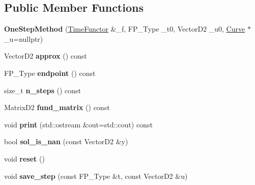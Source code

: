 \subsection*{Public Member Functions}
\begin{DoxyCompactItemize}
\item 
\mbox{\label{classOneStepMethod_af80b8284dc4c01633056d626e96dcce2}} 
{\bfseries One\+Step\+Method} (\hyperlink{classTimeFunctor}{Time\+Functor} \&\+\_\+f, F\+P\+\_\+\+Type \+\_\+t0, Vector\+D2 \+\_\+u0, \hyperlink{classCurve}{Curve} $\ast$\+\_\+u=nullptr)
\item 
\mbox{\label{classOneStepMethod_a5f4529edf5aae96d1dd0061b7a798e4f}} 
Vector\+D2 {\bfseries approx} () const
\item 
\mbox{\label{classOneStepMethod_a5fa1efcb274907b97f31cfbbb0c5dc07}} 
F\+P\+\_\+\+Type {\bfseries endpoint} () const
\item 
\mbox{\label{classOneStepMethod_a7ae5bcaf0c1e48551456a6f0835414d2}} 
size\+\_\+t {\bfseries n\+\_\+steps} () const
\item 
\mbox{\label{classOneStepMethod_ad59a0fce9906ba9159da74aea44b3431}} 
Matrix\+D2 {\bfseries fund\+\_\+matrix} () const
\item 
\mbox{\label{classOneStepMethod_aa3fc1d095086c736ef23c60e56034474}} 
void {\bfseries print} (std\+::ostream \&out=std\+::cout) const
\item 
\mbox{\label{classOneStepMethod_ad5e6154e9cc700056474c1c6128e3e9f}} 
bool {\bfseries sol\+\_\+is\+\_\+nan} (const Vector\+D2 \&y)
\item 
\mbox{\label{classOneStepMethod_a4e6743b0343a6c5bb75e423649915b86}} 
void {\bfseries reset} ()
\item 
\mbox{\label{classOneStepMethod_a511d73f8ac7ba27a4e0289b70be7ffad}} 
void {\bfseries save\+\_\+step} (const F\+P\+\_\+\+Type \&t, const Vector\+D2 \&u)
\item 
\mbox{\label{classOneStepMethod_aee957997a620c414ebb999df49debf5b}} 

\end{DoxyCompactItemize}
